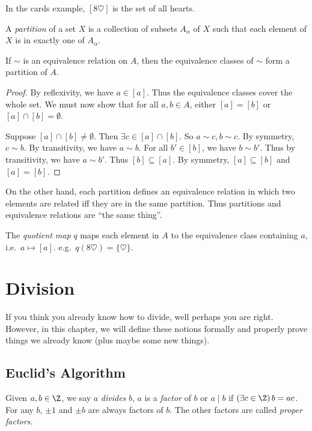 \documentclass[a4paper]{article}
\begin{document}
\begin{eg}
  In the cards example, $[8\heartsuit]$ is the set of all hearts.
\end{eg}

\begin{defi}
  A \emph{partition} of a set $X$ is a collection of subsets $A_\alpha$ of $X$ such that each element of $X$ is in exactly one of $A_\alpha$.
\end{defi}

\begin{thm}
  If $\sim$ is an equivalence relation on $A$, then the equivalence classes of $\sim$ form a partition of $A$.
\end{thm}

\begin{proof}
  By reflexivity, we have $a\in [a]$. Thus the equivalence classes cover the whole set. We must now show that for all $a, b\in A$, either $[a] = [b]$ or $[a]\cap [b]=\emptyset$.

  Suppose $[a]\cap[b]\not=\emptyset$. Then $\exists c\in [a]\cap[b]$. So $a\sim c, b\sim c$. By symmetry, $c\sim b$. By transitivity, we have $a\sim b$. For all $b'\in [b]$, we have $b\sim b'$. Thus by transitivity, we have $a\sim b'$. Thus $[b]\subseteq[a]$. By symmetry, $[a]\subseteq[b]$ and $[a] = [b]$.
\end{proof}

On the other hand, each partition defines an equivalence relation in which two elements are related iff they are in the same partition. Thus partitions and equivalence relations are ``the same thing''.
\begin{defi}
  The \emph{quotient map} $q$ maps each element in $A$ to the equivalence class containing $a$, i.e.\ $a\mapsto [a]$. e.g.\ $q(8\heartsuit) = \{\heartsuit\}$.
\end{defi}

\section{Division}
If you think you already know how to divide, well perhaps you are right. However, in this chapter, we will define these notions formally and properly prove things we already know (plus maybe some new things).
\subsection{Euclid's Algorithm}
\begin{defi}
  Given $a, b\in \Z$, we say $a$ \emph{divides} $b$, $a$ is a \emph{factor} of $b$ or $a\mid b$ if $(\exists c\in \Z)\,b = ac$. For any $b$, $\pm 1$ and $\pm b$ are always factors of $b$. The other factors are called \emph{proper factors}.
\end{defi}
\end{document}
